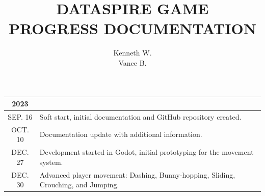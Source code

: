 \documentclass[legalpaper]{ltxdoc}
\begin{document}
	\pagecolor{gray}
	\title{\textsf{DATASPIRE GAME\\PROGRESS DOCUMENTATION}}
	\author{Kenneth W.\\Vance B.}
	\maketitle
	
	\pagebreak
	
	\noindent \begin{tabular}{ c|m{16cm} }
		\huge \textbf{2023} \normalsize & \\
		\hline
		SEP. 16 & Soft start, initial documentation and GitHub repository created. \\
		\hline
		OCT. 10 & Documentation update with additional information. \\
		\hline
		DEC. 27 & Development started in Godot, initial prototyping for the movement system. \\
		\hline
		DEC. 30 & Advanced player movement: Dashing, Bunny-hopping, Sliding, Crouching, and Jumping. \\
		\hline
	\end{tabular}\\\\\\
	
\end{document}
